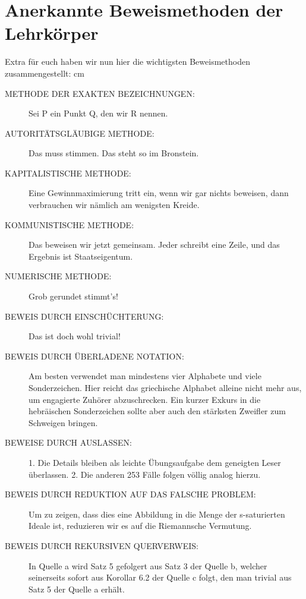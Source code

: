 \section{Anerkannte Beweismethoden der Lehrkörper}


Extra für euch haben wir nun hier die wichtigsten Beweismethoden
zusammengestellt:
 cm

\begin{description}
    \item[METHODE DER EXAKTEN BEZEICHNUNGEN:] Sei P ein Punkt Q,
    den wir R nennen.

    \item[AUTORITÄTSGLÄUBIGE METHODE:] Das
    muss stimmen. Das steht so im Bronstein.
    
    \item[KAPITALISTISCHE METHODE:] Eine Gewinnmaximierung tritt ein, wenn
    wir gar nichts beweisen, dann verbrauchen wir nämlich am wenigsten
    Kreide.
    
    \item[KOMMUNISTISCHE METHODE:] Das beweisen wir jetzt gemeinsam. Jeder
    schreibt eine Zeile, und das Ergebnis ist Staatseigentum.
    
    \item [NUMERISCHE METHODE:] Grob gerundet stimmt's!
    
    \item [BEWEIS DURCH EINSCHÜCHTERUNG:] Das ist doch wohl trivial!
    
    \item [BEWEIS DURCH ÜBERLADENE NOTATION:] Am besten verwendet man mindestens
    vier Alphabete und viele Sonderzeichen. Hier reicht das griechische
    Alphabet alleine nicht mehr aus, um engagierte Zuhörer
    abzuschrecken. Ein kurzer Exkurs in die hebräischen Sonderzeichen
    sollte aber auch den stärksten Zweifler zum Schweigen bringen.
    
    \item [BEWEISE DURCH AUSLASSEN:] 1. Die Details bleiben als leichte
    Übungsaufgabe dem geneigten Leser überlassen. 2. Die anderen 253
    Fälle folgen völlig analog hierzu.
    
    \item [BEWEIS DURCH REDUKTION AUF DAS FALSCHE PROBLEM:] Um zu zeigen, dass
    dies eine Abbildung in die Menge der s-saturierten Ideale ist,
    reduzieren wir es auf die Riemannsche Vermutung.
    
    \item [BEWEIS DURCH REKURSIVEN QUERVERWEIS:] In Quelle a wird Satz 5
    gefolgert aus Satz 3 der Quelle b, welcher seinerseits sofort aus
    Korollar 6.2 der Quelle c folgt, den man trivial aus Satz 5 der
    Quelle a erhält.
    

\end{description}
